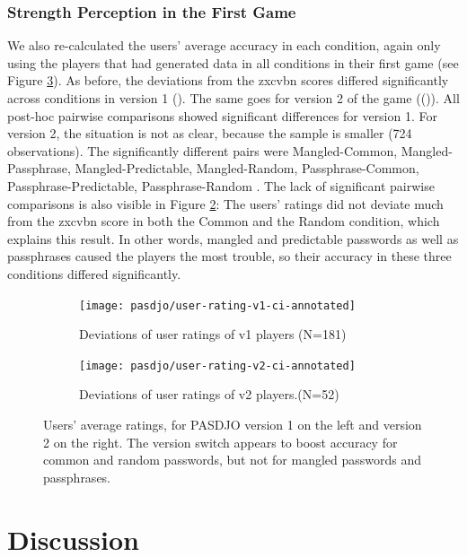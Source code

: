 \subsubsection{Strength Perception in the First Game}
We also re-calculated the users' average accuracy in each condition, again only using the players that had generated data in all conditions in their first game (see Figure \ref{fig:pasdjo:v1-v2-deviations}). As before, the deviations from the zxcvbn scores differed significantly across conditions in version 1 (). The same goes for version 2 of the game (()). All post-hoc pairwise comparisons showed significant differences  for version 1. For version 2, the situation is not as clear, because the sample is smaller (724 observations). The significantly different pairs were Mangled-Common, Mangled-Passphrase, Mangled-Predictable, Mangled-Random, Passphrase-Common, Passphrase-Predictable, Passphrase-Random . The lack of significant pairwise comparisons is also visible in Figure \ref{fig:pasdjo:v2-performance}: The users' ratings did not deviate much from the zxcvbn score in both the Common and the Random condition, which explains this result. In other words, mangled and predictable passwords as well as passphrases caused the players the most trouble, so their accuracy in these three conditions differed significantly. 
\begin{figure}[htbp]
	\begin{subfigure}[t]{0.49\linewidth}
		\texttt{[image: pasdjo/user-rating-v1-ci-annotated]}
		\caption{\label{fig:pasdjo:1y-performance}Deviations of user ratings of v1 players (N=181)}
	\end{subfigure}
	\begin{subfigure}[t]{0.49\linewidth}
		\texttt{[image: pasdjo/user-rating-v2-ci-annotated]}
		\caption{\label{fig:pasdjo:v2-performance}Deviations of user ratings of v2 players.(N=52)}
	\end{subfigure}
	\caption{\label{fig:pasdjo:v1-v2-deviations} Users' average ratings, for PASDJO version 1 on the left and version 2 on the right. The version switch appears to boost accuracy for common and random passwords, but not for mangled passwords and passphrases.}
\end{figure}



\section{Discussion}
